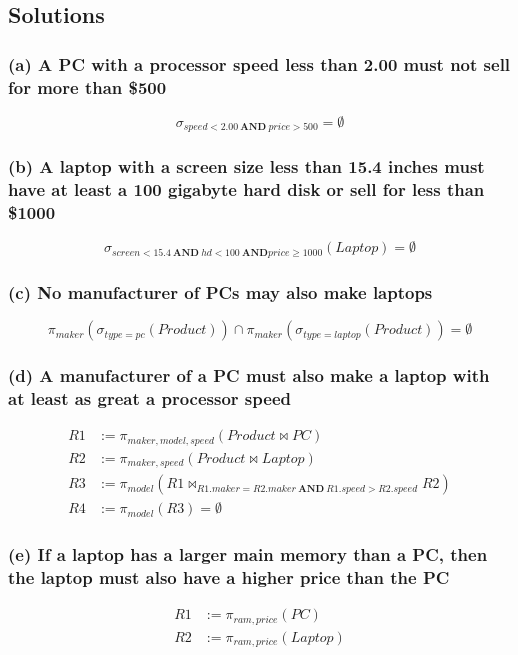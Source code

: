 \documentclass{cshwk}
\begin{document}
\subsection*{Solutions}

\subsubsection*{(a) A PC with a processor speed less than 2.00 must not sell for more than \$500}

\[
    \sigma_{speed < 2.00 \ \mathbf{AND} \ price > 500} = \emptyset
\]

\subsubsection*{(b) A laptop with a screen size less than 15.4 inches must have at least a 100 gigabyte hard disk or sell for less than \$1000}

\[
    \sigma_{screen < 15.4 \ \mathbf{AND} \ hd < 100 \ \mathbf{AND} price \geq 1000}(Laptop) = \emptyset
\]

\subsubsection*{(c) No manufacturer of PCs may also make laptops}

\[
    \pi_{maker}(\sigma_{type=pc}(Product))\cap \pi_{maker}(\sigma_{type=laptop}(Product)) = \emptyset
\]

\subsubsection*{(d) A manufacturer of a PC must also make a laptop with at least as great a processor speed}

\begin{align*}
    R1 & := \pi_{maker, model, speed}(Product \bowtie PC)              \\
    R2 & := \pi_{maker, speed}(Product \bowtie Laptop)                 \\
    R3 & := \pi_{model}(R1 \bowtie_{R1.maker=R2.maker \ \mathbf{AND} \
    R1.speed > R2.speed} R2)                                           \\
    R4 & := \pi_{model}(R3) = \emptyset
\end{align*}

\subsubsection*{(e) If a laptop has a larger main memory than a PC, then the laptop must also have a higher price than the PC}
\begin{align*}
    R1 & := \pi_{ram, price}(PC)     \\
    R2 & := \pi_{ram, price}(Laptop) \\
\end{align*}
\end{document}
